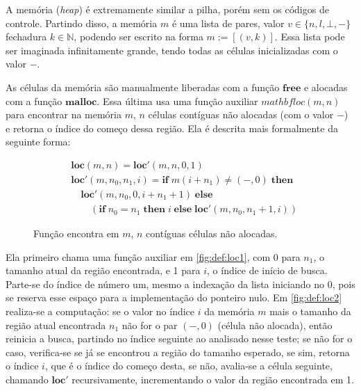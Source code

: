 A memória (\emph{heap}) é extremamente similar a pilha, porém sem os códigos de controle. Partindo disso, a memória $m$ é uma lista de pares, valor $v \in \{n, l, \bot, -\}$ fechadura $k \in \mathbb{N}$, podendo ser escrito na forma $m := [(v, k)]$. Essa lista pode ser imaginada infinitamente grande, tendo todas as células inicializadas com o valor $-$.

As células da memória são manualmente liberadas com a função $\mathbf{free}$ e alocadas com a função $\mathbf{malloc}$. Essa última usa uma função auxiliar $mathbf{loc(m,n)}$ para encontrar na memória $m$, $n$ células contíguas não alocadas (com o valor $-$) e retorna o índice do começo dessa região. Ela é descrita mais formalmente da seguinte forma:

\begin{figure}[ht]
	\begin{align}
	&\mathbf{loc}(m,n) = \mathbf{loc}'(m, n, 0, 1) \label{fig:def:loc1}\\
	& \mathbf{loc}'(m, n_0 , n_1, i) = \mathbf{if}\; m(i + n_1) \neq (-,0) \; \mathbf{then}\nonumber \\
	&\quad\mathbf{loc}'(m, n_0, 0, i + n_1 + 1)\; \mathbf{else} \nonumber\\
	&\quad\quad(\mathbf{if}\; n_0 = n_1 \; \mathbf{then}\; i \;\mathbf{else}\; \mathbf{loc}'(m, n_0, n_1 + 1, i)) \label{fig:def:loc2}
	\end{align}
	\caption{Função encontra em $m$, $n$ contíguas células não alocadas.}
	\label{fig:def:loc}
\end{figure}

\noindent Ela primeiro chama uma função auxiliar em \ref{fig:def:loc1}, com 0 para $n_1$, o tamanho atual da região encontrada,  e 1 para $i$, o índice de início de busca. Parte-se do índice de número um, mesmo a indexação da lista iniciando no 0, pois se reserva esse espaço para a implementação do ponteiro nulo. Em \ref{fig:def:loc2} realiza-se a computação: se o valor no índice $i$ da memória $m$ mais o tamanho da região atual encontrada $n_1$ não for o par $(-,0)$ (célula não alocada), então reinicia a busca, partindo no índice seguinte ao analisado nesse teste; se não for o caso, verifica-se se já se encontrou a região do tamanho esperado, se sim, retorna o índice $i$, que é o índice do começo desta, se não, avalia-se a célula seguinte, chamando $\mathbf{loc}'$ recursivamente, incrementando o valor da região encontrada em 1.

